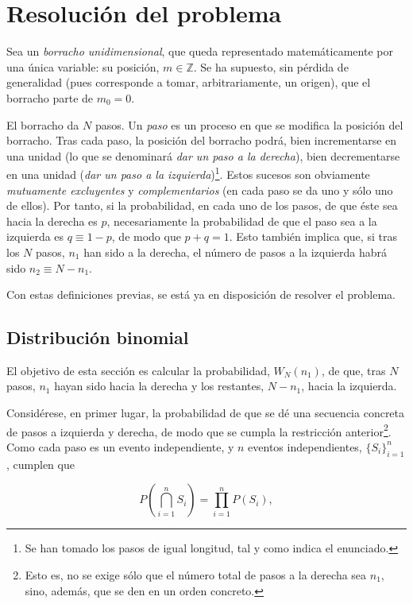 \section{Resolución del problema}
\label{sec:a}
Sea un \textit{borracho unidimensional}, que queda representado matemáticamente por una única variable: su posición, $m \in \mathbb Z$. Se ha supuesto, sin pérdida de generalidad (pues corresponde a tomar, arbitrariamente, un origen), que el borracho parte de $m_0 = 0$. 

El borracho da $N$ pasos. Un \textit{paso} es un proceso en que se modifica la posición del borracho. Tras cada paso, la posición del borracho podrá, bien incrementarse en una unidad (lo que se denominará \textit{dar un paso a la derecha}), bien decrementarse en una unidad (\textit{dar un paso a la izquierda})\footnote{Se han tomado los pasos de igual longitud, tal y como indica el enunciado.}. Estos sucesos son obviamente \textit{mutuamente excluyentes} y \textit{complementarios} (en cada paso se da uno y sólo uno de ellos). Por tanto, si la probabilidad, en cada uno de los pasos, de que éste sea hacia la derecha es $p$, necesariamente la probabilidad de que el paso sea a la izquierda es $q \equiv 1 - p$, de modo que $p + q = 1$. Esto también implica que, si tras los $N$ pasos, $n_1$ han sido a la derecha, el número de pasos a la izquierda habrá sido $n_2 \equiv N - n_1$.

Con estas definiciones previas, se está ya en disposición de resolver el problema.

\subsection{Distribución binomial}
\label{sec:a_binomial}

El objetivo de esta sección es calcular la probabilidad, $W_N(n_1)$, de que, tras $N$ pasos, $n_1$ hayan sido hacia la derecha y los restantes, $N - n_1$, hacia la izquierda. 

Considérese, en primer lugar, la probabilidad de que se dé una secuencia concreta de pasos a izquierda y derecha, de modo que se cumpla la restricción anterior\footnote{Esto es, no se exige sólo que el número total de pasos a la derecha sea $n_1$, sino, además, que se den en un orden concreto.}. Como cada paso es un evento independiente, y $n$ eventos independientes, $\{S_i\}_{i=1}^n$, cumplen que 

\begin{equation}
	P \left(\bigcap\limits^n_{i=1} S_i \right) = \prod\limits^n_{i=1} P\left(S_i\right),
	\label{eq:eventos_independientes}
\end{equation}


